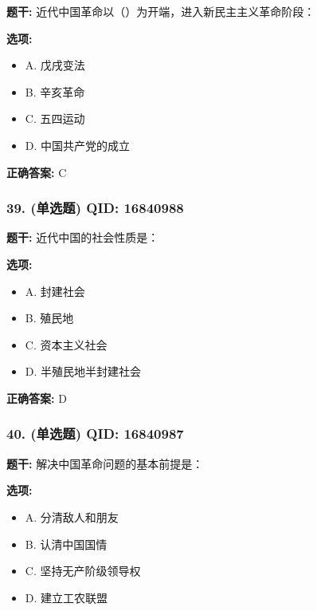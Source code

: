 \documentclass[12pt,UTF8]{ctexart}
\begin{document}
\textbf{题干:}
近代中国革命以（）为开端，进入新民主主义革命阶段：

\textbf{选项:}
\begin{itemize}[leftmargin=*]

  \item A. 戊戌变法

  \item B. 辛亥革命

  \item C. 五四运动

  \item D. 中国共产党的成立

\end{itemize}

\textbf{正确答案:}
C

\vspace{0.3em}\hrulefill\vspace{0.7em}

\subsubsection*{39. (单选题) \small QID: 16840988}

\textbf{题干:}
近代中国的社会性质是：

\textbf{选项:}
\begin{itemize}[leftmargin=*]

  \item A. 封建社会

  \item B. 殖民地

  \item C. 资本主义社会

  \item D. 半殖民地半封建社会

\end{itemize}

\textbf{正确答案:}
D

\vspace{0.3em}\hrulefill\vspace{0.7em}

\subsubsection*{40. (单选题) \small QID: 16840987}

\textbf{题干:}
解决中国革命问题的基本前提是：

\textbf{选项:}
\begin{itemize}[leftmargin=*]

  \item A. 分清敌人和朋友

  \item B. 认清中国国情

  \item C. 坚持无产阶级领导权

  \item D. 建立工农联盟

\end{itemize}
\end{document}
